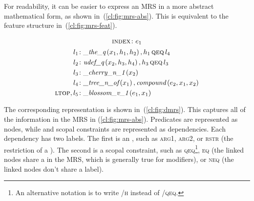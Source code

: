 \documentclass[output=paper,nonflat]{langsci/langscibook}
\begin{document}
For readability, it can be easier to express an MRS
in a more abstract mathematical form, as shown in~(\ref{cl:fig:mrs-abs}).
This is equivalent to the feature structure in~(\ref{cl:fig:mrs-feat}).

\begin{exe}
	\setlength{\abovedisplayskip}{1ex}
	\setlength{\belowdisplayskip}{1ex}
	\ex\label{cl:fig:mrs-abs}
	\begin{minipage}[c]{.6\textwidth}
	\vspace*{-1\baselineskip}
	\begin{gather*}
		\textsc{index}\colon e_1 \\
		\begin{aligned}
			l_1\colon & \textit{\_the\_q}\left(x_1,h_1,h_2\right), h_1 \,\textsc{qeq}\, l_4 \\
			l_2\colon & \textit{udef\_q}\left(x_2,h_3,h_4\right), h_3 \,\textsc{qeq}\, l_3 \\
			l_3\colon & \textit{\_cherry\_n\_1}\left(x_2\right) \\
			l_4\colon & \textit{\_tree\_n\_of}\left(x_1\right), \textit{compound}\left(e_2,x_1,x_2\right) \\
			\textsc{ltop}, l_5\colon & \textit{\_blossom\_v\_1}\left(e_1,x_1\right)
		\end{aligned}
	\end{gather*}
	\end{minipage}
\end{exe}

The corresponding 
representation is shown in~(\ref{cl:fig:dmrs}).
This captures all of the information
in the MRS in (\ref{cl:fig:mrs-abs}).
Predicates are represented as nodes,
while  and scopal constraints are represented as dependencies.
Each dependency has two labels.
The first is an ,
such as \textsc{arg1}, \textsc{arg2},
or \textsc{rstr} (the restriction of a ).
The second is a scopal constraint,
such as \textsc{qeq}\footnote{%
	An alternative notation is to write
	\textsc{/h} instead of \textsc{/qeq}.
},
\textsc{eq} (the linked nodes share a  in the MRS,
which is generally true for modifiers),
or \textsc{neq} (the linked nodes don't share a label).
\end{document}
